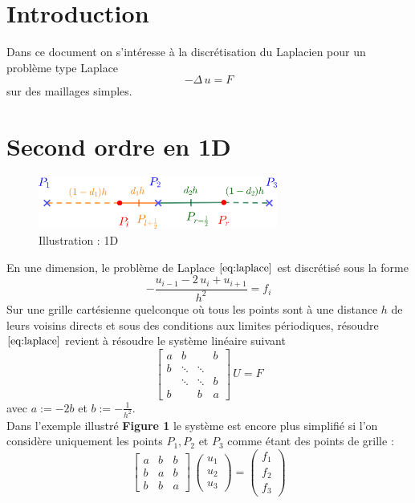 \documentclass[11pt,a4paper]{article}
\begin{document}
\section{Introduction}
Dans ce document on s'intéresse à la discrétisation du Laplacien pour un problème type Laplace
\begin{equation}
-\Delta\,u = F \label{eq:laplace}
\end{equation}
sur des maillages simples.

\section{Second ordre en 1D}
\begin{figure}[h]
\centering
\includegraphics[width=0.7\textwidth]{secondOrdre1D.png}
\caption{Illustration : 1D}
\end{figure}

En une dimension, le problème de Laplace $\eqref{eq:laplace}$ est discrétisé sous la forme 
\begin{equation}
-\frac{u_{i-1} - 2\,u_i + u_{i+1}}{h^2} = f_i
\end{equation}
Sur une grille cartésienne quelconque où tous les points sont à une distance $h$ de leurs voisins directs et sous des conditions aux limites périodiques, résoudre $\eqref{eq:laplace}$ revient à résoudre le système linéaire suivant
\begin{equation}
\left[\begin{matrix}
a & b & &b \\
b & \ddots & \ddots &\\
& \ddots & \ddots & b\\
b& & b & a
\end{matrix}\right]\,U = F
\end{equation}
avec $a:= -2b$ et $b:=-\frac{1}{h^2}$.\\

Dans l'exemple illustré \textbf{Figure 1} le système est encore plus simplifié si l'on considère uniquement les points $P_1, P_2$ et $P_3$ comme étant des points de grille :
\begin{equation}
\left[\begin{matrix}
a & b & b\\
b & a & b\\
b & b & a
\end{matrix}\right]\,\left(\begin{array}{c}
u_1\\
u_2\\
u_3
\end{array}\right) = \left(\begin{array}{c}
f_1\\
f_2\\
f_3
\end{array}\right)
\end{equation}
\end{document}
